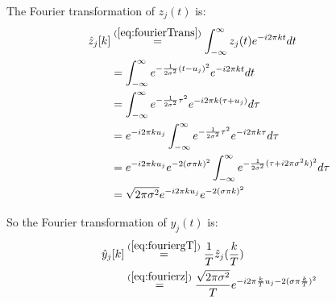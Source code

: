 \documentclass[12pt]{article}
\numberwithin{equation}{section}
\begin{document}
The Fourier transformation of $z_j(t)$ is: 
\begin{align}\begin{split}\label{eq:fourierz}
	\hat{z}_j[k]
	&\stackrel{(\ref{eq:fourierTrans})}{=} \int^{\infty}_{-\infty} z_j(t) e^{-i 2 \pi k t} dt \\ 
	&\stackrel{}{=} \int^{\infty}_{-\infty} e^{-\frac{1}{2\sigma^2}(t-u_j)^2} e^{-i 2 \pi k t} dt \\ 
	&\stackrel{}{=} \int^{\infty}_{-\infty} e^{-\frac{1}{2\sigma^2}\tau^2} e^{-i 2 \pi k (\tau+u_j)} d\tau \\ 
	&\stackrel{}{=} e^{-i 2 \pi k u_j} \int^{\infty}_{-\infty} e^{-\frac{1}{2\sigma^2}\tau^2} e^{-i 2 \pi k \tau} d\tau \\ 
	&\stackrel{}{=} e^{-i 2 \pi k u_j} e^{-2(\sigma \pi k)^2} \int^{\infty}_{-\infty} e^{-\frac{1}{2\sigma^2}(\tau+ i 2 \pi \sigma^2 k)^2} d\tau \\ 
	&\stackrel{}{=} \sqrt{2\pi\sigma^2}e^{-i 2 \pi k u_j} e^{-2(\sigma \pi k)^2} 
\end{split}\end{align} \par
So the Fourier transformation of $y_j(t)$ is:
\begin{align}\begin{split}
	\hat{y}_j[k]
	&\stackrel{(\ref{eq:fouriergT})}{=} \frac{1}{T} \hat{z}_j(\frac{k}{T}) \\
	&\stackrel{(\ref{eq:fourierz})}{=} \frac{\sqrt{2\pi\sigma^2}}{T}e^{-i 2 \pi \frac{k}{T} u_j-2(\sigma \pi \frac{k}{T})^2} 
\end{split}\end{align} \par
\end{document}
